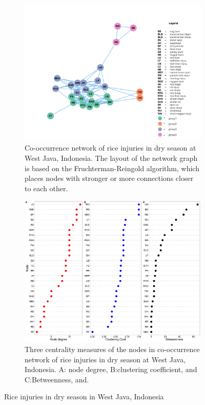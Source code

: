 \begin{figure}
    \centering
    \begin{subfigure}[b]{1\textwidth}
        \includegraphics[width = 1\textwidth]{figures/networkWJ_ds.pdf}
        \caption{Co-occurrence network of rice injuries in dry season at West Java, Indonesia. The layout of the network graph is based on the Fruchterman-Reingold algorithm, which places nodes with stronger or more connections closer to each other.}
        \label{fig:networkWJ_ds}
    \end{subfigure}
    \begin{subfigure}[b]{1\textwidth}
        \includegraphics[width = 1\textwidth]{figures/nodepropWJ_ds.pdf}
        \caption{Three centrality measures of the nodes in co-occurrence network of rice injuries in dry season at West Java, Indonesia. A: node degree, B:clustering coefficient, and C:Betweenness, and.}
        \label{fig:nodepropWJ_ds}
    \end{subfigure}
    \caption{Rice injuries in dry season in West Java, Indonesia}
    \label{fig:WJ_ds}
\end{figure}

